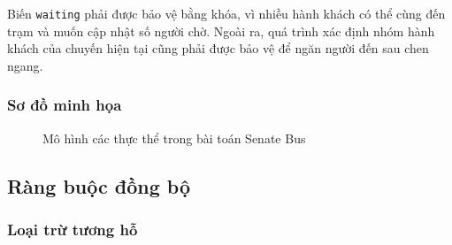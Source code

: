 Biến \texttt{waiting} phải được bảo vệ bằng khóa, vì nhiều hành khách
có thể cùng đến trạm và muốn cập nhật số người chờ. Ngoài ra, quá trình
xác định nhóm hành khách của chuyến hiện tại cũng phải được bảo vệ để
ngăn người đến sau chen ngang.

\subsubsection*{Sơ đồ minh họa}

\begin{figure}[H]
\centering
{}
\caption{Mô hình các thực thể trong bài toán Senate Bus}
\label{fig:senate-bus-model}

\end{figure}


\subsection{Ràng buộc đồng bộ}

\subsubsection*{Loại trừ tương hỗ}

